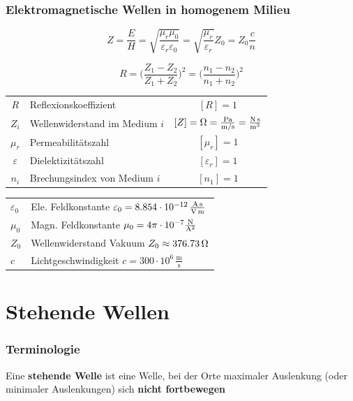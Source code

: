 \subsubsection{Elektromagnetische Wellen in homogenem Milieu}

$$ \boxed{ Z = \frac{E}{H} = \sqrt{ \frac{\mu_r \mu_0}{\varepsilon_r \varepsilon_0}} = \sqrt{\frac{\mu_r}{\varepsilon_r}} Z_0 = Z_0 \frac{c}{n}} $$


$$ \boxed{ R = \Big(  \frac{Z_1 - Z_2}{Z_1 + Z_2}  \Big)^2 =  \Big(  \frac{n_1 - n_2}{n_1 + n_2}  \Big)^2 }  $$

\renewcommand{\arraystretch}{1.1}
\begin{tabular}{clc}
$R$ & Reflexionskoeffizient  & $[R] = 1$ \\
$Z_i$ & Wellenwiderstand im Medium $i$ & $[Z] = \mathrm{\Omega} = \frac{\mathrm{Pa}}{\mathrm{m} / \mathrm{s}} = \frac{\mathrm{N} \, \mathrm{s}}{\mathrm{m}^3}$ \\
$\mu_r$ & Permeabilitätszahl & $[\mu_r] = 1$ \\
$\varepsilon$ & Dielektizitätszahl & $[\varepsilon_r] = 1$ \\
$n_i$ & Brechungsindex von Medium $i$ & $[n_1] = 1$ \\
\end{tabular}


\renewcommand{\arraystretch}{1.2}
\begin{tabular}{ll}
$\varepsilon_0$ & Ele. Feldkonstante $\varepsilon_0 = 8.854 \cdot 10^{-12} \, \frac{\mathrm{A} \, \mathrm{s}}{\mathrm{V} \, \mathrm{m}}$ \\
$\mu_0$ & Magn. Feldkonstante $\mu_0 = 4 \pi \cdot 10^{-7} \frac{\mathrm{N}}{\mathrm{A}^2}$\\
$Z_0$ & Wellenwiderstand Vakuum $Z_0 \approx 376.73 \, \mathrm{\Omega}$ \\
$c$ & Lichtgeschwindigkeit $c = 300 \cdot 10^6 \, \mathrm{\frac{m}{s}}$ \\ 
\end{tabular}
\renewcommand{\arraystretch}{1}





\section{Stehende Wellen}

\subsubsection{Terminologie}

Eine \textbf{stehende Welle} ist eine Welle, bei der Orte maximaler Auslenkung (oder minimaler Auslenkungen) sich
\textbf{nicht fortbewegen} 


